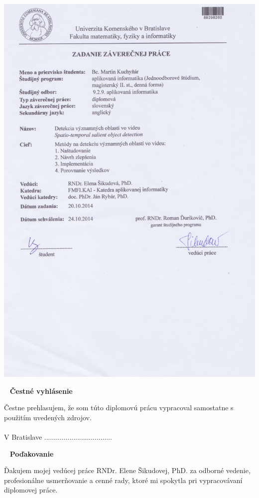 \newpage
\thispagestyle{empty}
\vspace*{-35px}\hspace*{-30px}
\includegraphics[scale=0.2]{pics/zadanie.jpeg}

\newpage
{~}\vfill
{\noindent \large\bf Čestné vyhlásenie}
\vspace{1.5cm}

Čestne prehlasujem, že som túto diplomovú prácu vypracoval samostatne s použitím uvedených zdrojov.\\\\
V Bratislave
\hfill ...................................
\vspace{1cm}

\newpage
{~}\vfill
{\noindent\large\bf Poďakovanie}
\vspace{1.5cm}

Ďakujem mojej vedúcej práce RNDr. Elene Šikudovej, PhD. za odborné vedenie, profesionálne usmerňovanie a cenné rady, ktoré mi spokytla pri vypracovávaní diplomovej práce. \\
\vspace{1cm}

\newpage
